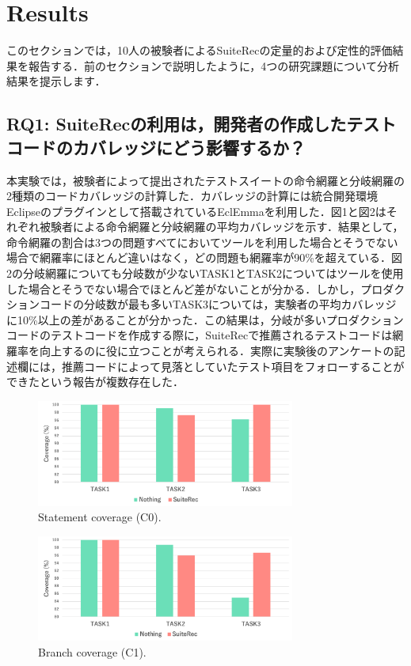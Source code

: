 \documentclass[conference]{IEEEtran}
\begin{document}
\section{Results}

このセクションでは，10人の被験者によるSuiteRecの定量的および定性的評価結果を報告する．前のセクションで説明したように，4つの研究課題について分析結果を提示します．

\subsection{RQ1: SuiteRecの利用は，開発者の作成したテストコードのカバレッジにどう影響するか？}
本実験では，被験者によって提出されたテストスイートの命令網羅と分岐網羅の2種類のコードカバレッジの計算した．カバレッジの計算には統合開発環境Eclipseのプラグインとして搭載されているEclEmmaを利用した．図1と図2はそれぞれ被験者による命令網羅と分岐網羅の平均カバレッジを示す．結果として，命令網羅の割合は3つの問題すべてにおいてツールを利用した場合とそうでない場合で網羅率にほとんど違いはなく，どの問題も網羅率が90\%を超えている．図2の分岐網羅についても分岐数が少ないTASK1とTASK2についてはツールを使用した場合とそうでない場合でほとんど差がないことが分かる．しかし，プロダクションコードの分岐数が最も多いTASK3については，実験者の平均カバレッジに10\%以上の差があることが分かった．この結果は，分岐が多いプロダクションコードのテストコードを作成する際に，SuiteRecで推薦されるテストコードは網羅率を向上するのに役に立つことが考えられる．実際に実験後のアンケートの記述欄には，推薦コードによって見落としていたテスト項目をフォローすることができたという報告が複数存在した．
\begin{figure}[htbp]
\centerline{\includegraphics[width=8.5cm]{C0.pdf}}
\caption{Statement coverage (C0).}
\label{fig4}
\end{figure}

\begin{figure}[htbp]
\centerline{\includegraphics[width=8.5cm]{C1.pdf}}
\caption{Branch coverage (C1).}
\label{fig5}
\end{figure}
\end{document}
